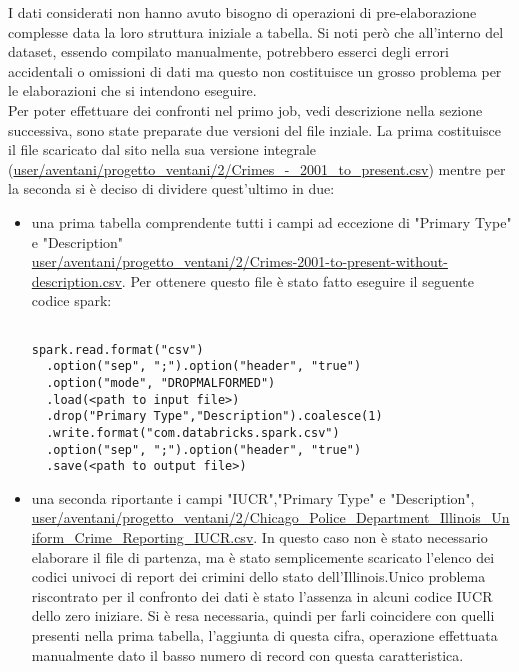 \documentclass[10pt]{article}
\begin{document}
I dati considerati non hanno avuto bisogno di operazioni di pre-elaborazione complesse data la loro struttura iniziale a tabella. Si noti però che all'interno del dataset, essendo compilato manualmente, potrebbero esserci degli errori accidentali o omissioni di dati ma questo non costituisce un grosso problema per le elaborazioni che si intendono eseguire. \\

Per poter effettuare dei confronti nel primo job, vedi descrizione nella sezione successiva, sono state preparate due versioni del file inziale.
La prima costituisce il file scaricato dal sito nella sua versione integrale (\url{user/aventani/progetto_ventani/2/Crimes_-_2001_to_present.csv}) mentre per la seconda si è deciso di dividere quest'ultimo in due:
\begin{itemize}
\item una prima tabella comprendente tutti i campi ad eccezione di "Primary Type" e "Description" \\ \url{user/aventani/progetto_ventani/2/Crimes-2001-to-present-without-description.csv}. Per ottenere questo file è stato fatto eseguire il seguente codice spark:
\begin{lstlisting}

spark.read.format("csv")
  .option("sep", ";").option("header", "true")
  .option("mode", "DROPMALFORMED")
  .load(<path to input file>)
  .drop("Primary Type","Description").coalesce(1)
  .write.format("com.databricks.spark.csv")
  .option("sep", ";").option("header", "true")
  .save(<path to output file>)

\end{lstlisting}

\item una seconda riportante i campi "IUCR","Primary Type" e "Description", \\ \url{user/aventani/progetto_ventani/2/Chicago_Police_Department_Illinois_Uniform_Crime_Reporting_IUCR.csv}. In questo caso non è stato necessario elaborare il file di partenza, ma è stato semplicemente scaricato l'elenco dei codici univoci di report dei crimini dello stato dell'Illinois.Unico problema riscontrato per il confronto dei dati è stato l'assenza in alcuni codice IUCR dello zero iniziare. Si è resa necessaria, quindi per farli coincidere con quelli presenti nella prima tabella, l'aggiunta di questa cifra, operazione effettuata manualmente dato il basso numero di record con questa caratteristica. 
\end{itemize}
\end{document}
